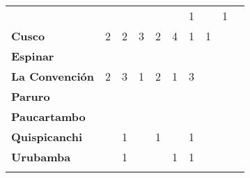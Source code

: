 \begin{tabular}{lccccccccc}
	&\cellcolor[HTML]{FCC46C}					
	&\cellcolor[HTML]{FCC46C}
	&\cellcolor[HTML]{FCC46C}					
	&\cellcolor[HTML]{FCC46C}
	&\cellcolor[HTML]{FCC46C}					
	&1
	&\cellcolor[HTML]{FCC46C}
	&1\\
	\textbf{Cusco}      															
	&2											
	&2		
	&3											
	&2
	&4											
	&1
	&1
	&\cellcolor[HTML]{FCC46C}\\								
	\textbf{Espinar}       					             							
	&\cellcolor[HTML]{FCC46C}					
	&\cellcolor[HTML]{FCC46C}
	&\cellcolor[HTML]{FCC46C}					
	&\cellcolor[HTML]{FCC46C}
	&\cellcolor[HTML]{FCC46C}					
	&\cellcolor[HTML]{FCC46C}
	&\cellcolor[HTML]{FCC46C}
	&\cellcolor[HTML]{FCC46C}\\	
	\textbf{La Convención}       
	&2											
	&3											
	&1											
	&2											
	&1											
	&3
	&\cellcolor[HTML]{FCC46C}
	&\cellcolor[HTML]{FCC46C}\\	
	\textbf{Paruro}                            					
	&\cellcolor[HTML]{FCC46C}					
	&\cellcolor[HTML]{FCC46C}					
	&\cellcolor[HTML]{FCC46C}					
	&\cellcolor[HTML]{FCC46C}					
	&\cellcolor[HTML]{FCC46C}
	&\cellcolor[HTML]{FCC46C} 					
	&\cellcolor[HTML]{FCC46C}
	&\cellcolor[HTML]{FCC46C}\\
	\textbf{Paucartambo}               		                       					
	&\cellcolor[HTML]{FCC46C}					
	&\cellcolor[HTML]{FCC46C}
	&\cellcolor[HTML]{FCC46C}					
	&\cellcolor[HTML]{FCC46C}
	&\cellcolor[HTML]{FCC46C}					
	&\cellcolor[HTML]{FCC46C}
	&\cellcolor[HTML]{FCC46C}
	&\cellcolor[HTML]{FCC46C}\\
	\textbf{Quispicanchi}          	      				
	&\cellcolor[HTML]{FCC46C}					
	&1											
	&\cellcolor[HTML]{FCC46C}					
	&1											
	&\cellcolor[HTML]{FCC46C}					
	&1
	&\cellcolor[HTML]{FCC46C}
	&\cellcolor[HTML]{FCC46C}\\
	\textbf{Urubamba}  
	&\cellcolor[HTML]{FCC46C}					
	&1											
	&\cellcolor[HTML]{FCC46C}					
	&\cellcolor[HTML]{FCC46C}					
	&1											
	&1	
	&\cellcolor[HTML]{FCC46C}
	&\cellcolor[HTML]{FCC46C}\\						
	&\multicolumn{1}{l}{}                       &\multicolumn{1}{l}{}            &\multicolumn{1}{l}{}                         
	&\multicolumn{1}{l}{}                       &\multicolumn{1}{l}{}            &\multicolumn{1}{l}{}                       &\multicolumn{1}{l}{}                       &\multicolumn{1}{l}{}            			    
\end{tabular}